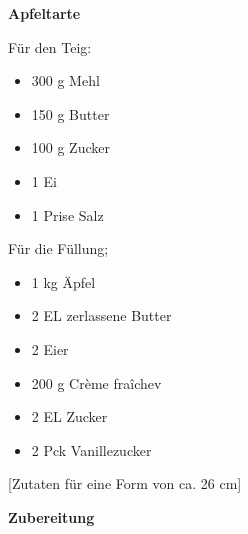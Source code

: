 

\parindent0pt	

\pagestyle{empty}


\textbf{\LARGE{Apfeltarte}}%

\hrulefill
\vspace*{\fill}
\begin{multicols}{2}	

Für den Teig:
\begin{itemize}
\item 300 g Mehl
\item 150 g Butter
\item 100 g Zucker
\item 1 Ei
\item 1 Prise Salz
\end{itemize}
\columnbreak
Für die Füllung;
\begin{itemize}
\item 1 kg Äpfel
\item 2 EL zerlassene Butter
\item 2 Eier
\item 200 g Crème fraîchev
\item 2 EL Zucker
\item 2 Pck Vanillezucker
\end{itemize}
\end{multicols}
\vfill									%

\vspace{1cm}
%
\begin{center}
%
[Zutaten für  eine Form von ca. 26 cm]%
\end{center}



\vfill
\newpage
\textbf{{\LARGE Zubereitung}}%

\hrulefill

